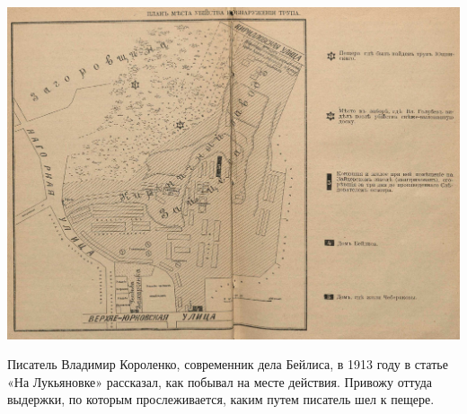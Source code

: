 \begin{center}
\includegraphics[width=\linewidth]{chast-kirvys/beylis/zamysl-map.jpg}
\end{center}


Писатель Владимир Короленко, современник дела Бейлиса, в 1913 году в статье «На Лукьяновке» рассказал, как побывал на месте действия. Привожу оттуда выдержки, по которым прослеживается, каким путем писатель шел к пещере.

